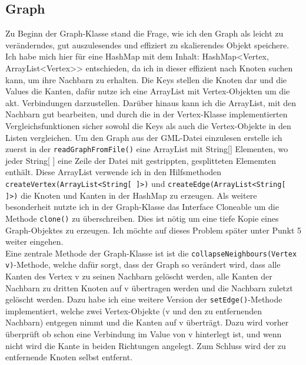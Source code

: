 \documentclass[12pt,a4paper]{article}
\begin{document}
\subsection{Graph}
Zu Beginn der Graph-Klasse stand die Frage, wie ich den Graph als leicht zu veränderndes, gut auszulesendes und effiziert zu skalierendes Objekt speichere. Ich habe mich hier für eine HashMap mit dem Inhalt: HashMap<Vertex, ArrayList<Vertex>> entschieden, da ich in dieser effizient nach Knoten suchen kann, um ihre Nachbarn zu erhalten. Die Keys stellen die Knoten dar und die Values die Kanten, dafür nutze ich eine ArrayList mit Vertex-Objekten um die akt. Verbindungen darzustellen. Darüber hinaus kann ich die ArrayList, mit den Nachbarn gut bearbeiten, und durch die in der Vertex-Klasse implementierten Vergleichsfunktionen sicher sowohl die Keys als auch die Vertex-Objekte in den Listen vergleichen. Um den Graph aus der GML-Datei einzulesen erstelle ich zuerst in der \texttt{readGraphFromFile()} eine ArrayList mit String[] Elementen, wo jeder String[ ] eine Zeile der Datei mit gestrippten, gesplitteten Elememten enthält. Diese ArrayList verwende ich in den Hilfsmethoden \texttt{createVertex(ArrayList<String[ ]>)} und \texttt{createEdge(ArrayList<String[ ]>)} die Knoten und Kanten in der HashMap zu erzeugen. Als weitere besonderheit nutzte ich in der Graph-Klasse das Interface \glqq Cloneable\grqq{} um die Methode \texttt{clone()} zu überschreiben. Dies ist nötig um eine tiefe Kopie eines Graph-Objektes zu erzeugen. Ich möchte auf dieses Problem später unter Punkt 5 weiter eingehen. \\
Eine zentrale Methode der Graph-Klasse ist ist die \texttt{collapseNeighbours(Vertex v)}-Methode, welche dafür sorgt, dass der Graph so verändert wird, dass alle Kanten des Vertex v zu seinen Nachbarn gelöscht werden, alle Kanten der Nachbarn zu dritten Knoten auf v übertragen werden und die Nachbarn zuletzt gelöscht werden. Dazu habe ich eine weitere Version der \texttt{setEdge()}-Methode implementiert, welche zwei Vertex-Objekte (v und den zu entfernenden Nachbarn) entgegen nimmt und die Kanten auf v überträgt. Dazu wird vorher überprüft ob schon eine Verbindung im Value von v hinterlegt ist, und wenn nicht wird die Kante in beiden \glqq Richtungen\grqq{} angelegt. Zum Schluss wird der zu entfernende Knoten selbst entfernt. 
\end{document}
